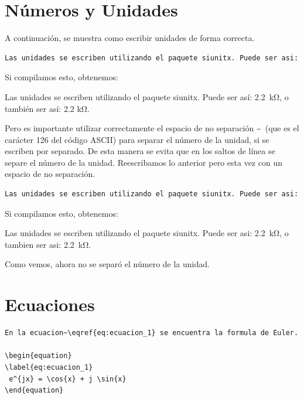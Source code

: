 \clearpage
\section{Números y Unidades}

A continuación, se muestra como escribir unidades de forma correcta.


\begin{lstlisting}[language=TeX, numbers=none]
Las unidades se escriben utilizando el paquete siunitx. Puede ser asi: \SI{2.2}{\kilo\ohm}, o tambien ser asi: \num{2.2} \si{\kilo\ohm}.
\end{lstlisting}
\normalsize

Si compilamos esto, obtenemos:

Las unidades se escriben utilizando el paquete siunitx. Puede ser así: \SI{2.2}{\kilo\ohm}, o también ser así: \num{2.2} \si{\kilo\ohm}.

\vspace{1cm}

Pero es importante utilizar correctamente el espacio de no separación \textasciitilde~(que es el carácter 126 del código ASCII) para separar el número de la unidad, si se escriben por separado. De esta manera se evita que en los saltos de línea se separe el número de la unidad. Reescribamos lo anterior pero esta vez con un espacio de no separación.


\begin{lstlisting}[language=TeX, numbers=none]
Las unidades se escriben utilizando el paquete siunitx. Puede ser asi: \SI{2.2}{\kilo\ohm}, o tambien ser asi: \num{2.2}~\si{\kilo\ohm}.
\end{lstlisting}
\normalsize

Si compilamos esto, obtenemos:

Las unidades se escriben utilizando el paquete siunitx. Puede ser asi: \SI{2.2}{\kilo\ohm}, o tambien ser asi: \num{2.2}~\si{\kilo\ohm}.

\vspace{1cm}

Como vemos, ahora no se separó el número de la unidad.

\clearpage
\section{Ecuaciones}

\footnotesize
\begin{lstlisting}
En la ecuacion~\eqref{eq:ecuacion_1} se encuentra la formula de Euler.

\begin{equation}
\label{eq:ecuacion_1}
 e^{jx} = \cos{x} + j \sin{x}
\end{equation}
\end{lstlisting}
\normalsize


